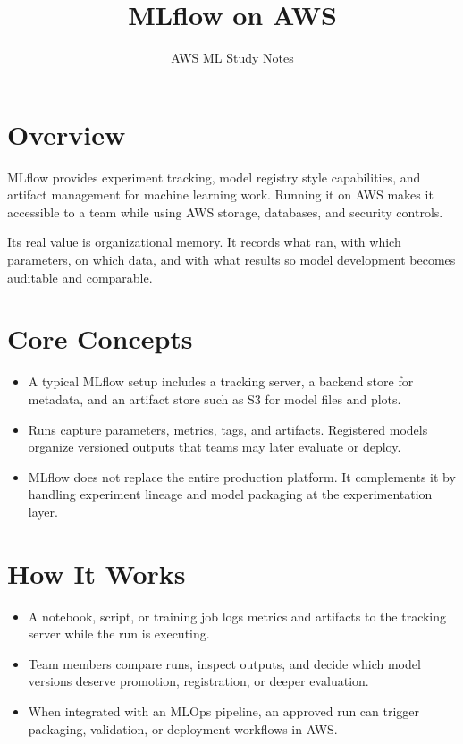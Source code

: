 \documentclass[10pt,twocolumn]{article}
\begin{document}
\title{\vspace{-1.6cm}MLflow on AWS}
\author{AWS ML Study Notes}
\date{}
\maketitle
\small

\section*{Overview}
MLflow provides experiment tracking, model registry style capabilities, and artifact management for machine learning work. Running it on AWS makes it accessible to a team while using AWS storage, databases, and security controls.

Its real value is organizational memory. It records what ran, with which parameters, on which data, and with what results so model development becomes auditable and comparable.

\section*{Core Concepts}
\begin{itemize}
\item A typical MLflow setup includes a tracking server, a backend store for metadata, and an artifact store such as S3 for model files and plots.
\item Runs capture parameters, metrics, tags, and artifacts. Registered models organize versioned outputs that teams may later evaluate or deploy.
\item MLflow does not replace the entire production platform. It complements it by handling experiment lineage and model packaging at the experimentation layer.
\end{itemize}

\section*{How It Works}
\begin{itemize}
\item A notebook, script, or training job logs metrics and artifacts to the tracking server while the run is executing.
\item Team members compare runs, inspect outputs, and decide which model versions deserve promotion, registration, or deeper evaluation.
\item When integrated with an MLOps pipeline, an approved run can trigger packaging, validation, or deployment workflows in AWS.
\end{itemize}
\end{document}

